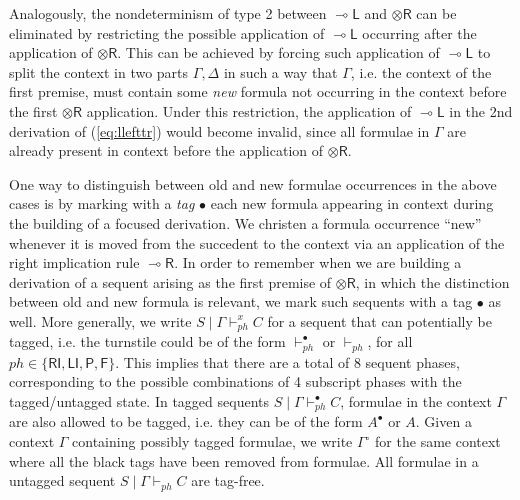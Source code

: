 \documentclass[submission,copyright,creativecommons]{eptcs}
\theoremstyle{definition}
\newcommand{\tr}{\otimes \mathsf{R}}
\newcommand{\lright}{{\multimap}\mathsf{R}}
\newcommand{\lleft}{{\multimap}\mathsf{L}}
\newcommand{\RI}{\mathsf{RI}}
\newcommand{\LI}{\mathsf{LI}}
\newcommand{\Pass}{\mathsf{P}}
\newcommand{\F}{\mathsf{F}}
\newcommand{\xvdash}{\vdash^{x}}
\begin{document}
Analogously, the nondeterminism of type 2 between $\lleft$ and $\tr$ can be eliminated by restricting the possible application of $\lleft$ occurring after the application of $\tr$. This can be achieved by forcing such application of $\lleft$ to split the context in two parts $\Gamma,\Delta$ in such a way that $\Gamma$, i.e. the context of the first premise, must contain some \emph{new} formula not occurring in the context before the first $\tr$ application. Under this restriction, the application of $\lleft$ in the 2nd derivation of (\ref{eq:llefttr}) would become invalid, since all formulae in $\Gamma$ are already present in context before the application of $\tr$.

One way to distinguish between old and new formulae occurrences in the above cases is by marking with a \emph{tag} $\bullet$ each new formula appearing in context during the building of a focused derivation. We christen a formula occurrence ``new'' whenever it is moved from the succedent to the context via an application of the right implication rule $\lright$. In order to remember when we are building a derivation of a sequent arising as the first premise of $\tr$, in which the distinction between old and new formula is relevant, we mark such sequents with a tag $\bullet$ as well.
More generally, we write $S \mid \Gamma \xvdash_{ph} C$ for a sequent that can potentially be tagged, i.e. the turnstile could be of the form $\vdash_{ph}^{\bullet}$ or $\vdash_{ph}$, for all $ph \in \{ \RI,\LI,\Pass,\F\}$. This implies that there are a total of 8 sequent phases, corresponding to the possible combinations of 4 subscript phases with the tagged/untagged state.
In tagged sequents  $S \mid \Gamma \vdash_{ph}^{\bullet} C$, formulae in the context $\Gamma$ are also allowed to be tagged, i.e. they can be of the form $A^\bullet$ or $A$. Given a context $\Gamma$ containing possibly tagged formulae, we write $\Gamma^{\circ}$ for the same context where all the black tags have been removed from formulae. All formulae in a untagged sequent $S \mid \Gamma \vdash_{ph} C$ are tag-free.
\end{document}
